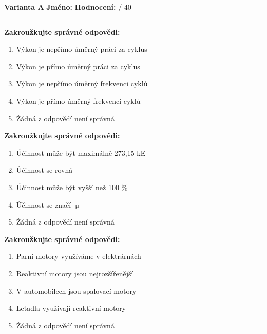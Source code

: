 \documentclass[../main.tex]{subfiles}
\begin{document}
\pagestyle{empty}

\textbf{Varianta A}
\hfill
\textbf{Jméno:}
\tecky{6cm}
\hspace{0.5cm}
\textbf{Hodnocení:}
\tecky{0.5cm}
{/}
{40}
\vspace{0.25cm}
\hrule
\vspace{0.25cm}

\begin{enumerate}[label={\textbf{\arabic*.}}]
\begin{minipage}{0.45\textwidth}
    \item \textbf{Zakroužkujte správné odpovědi:}
        \begin{enumerate}[label={\alph*)}, itemsep=0pt, topsep=0.15cm]
            \item {Výkon je nepřímo úměrný práci za cyklus}
            \item {Výkon je přímo úměrný práci za cyklus}
            \item {Výkon je nepřímo úměrný frekvenci cyklů}
            \item {Výkon je přímo úměrný frekvenci cyklů}
            \item {Žádná z odpovědí není správná}
        \end{enumerate}

    \item \textbf{Zakroužkujte správné odpovědi:}
        \begin{enumerate}[label={\alph*)}, itemsep=0pt, topsep=0.15cm]
            \item {Účinnost může být maximálně 273,15 kE}
            \item {Účinnost se rovná }
            \item {Účinnost může být vyšší než 100 \%}
            \item {Účinnost se značí \(\upmu\)}
            \item {Žádná z odpovědí není správná}
        \end{enumerate}

    \item \textbf{Zakroužkujte správné odpovědi:}
        \begin{enumerate}[label={\alph*)}, itemsep=0pt, topsep=0.15cm]
            \item {Parní motory využíváme v elektrárnách}
            \item {Reaktivní motory jsou nejrozšířenější}
            \item {V automobilech jsou spalovací motory}
            \item {Letadla využívají reaktivní motory}
            \item {Žádná z odpovědí není správná}
        \end{enumerate}


\end{minipage}
\end{enumerate}
\end{document}
